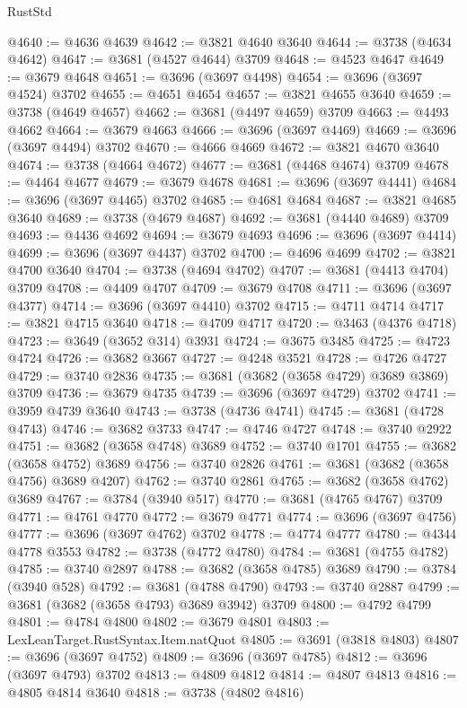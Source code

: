 \begin{lexlean}{RustStd}
\begin{coremodule}
@4640 := @4636 @4639
@4642 := @3821 @4640 @3640
@4644 := @3738 (@4634 @4642)
@4647 := @3681 (@4527 @4644) @3709
@4648 := @4523 @4647
@4649 := @3679 @4648
@4651 := @3696 (@3697 @4498)
@4654 := @3696 (@3697 @4524) @3702
@4655 := @4651 @4654
@4657 := @3821 @4655 @3640
@4659 := @3738 (@4649 @4657)
@4662 := @3681 (@4497 @4659) @3709
@4663 := @4493 @4662
@4664 := @3679 @4663
@4666 := @3696 (@3697 @4469)
@4669 := @3696 (@3697 @4494) @3702
@4670 := @4666 @4669
@4672 := @3821 @4670 @3640
@4674 := @3738 (@4664 @4672)
@4677 := @3681 (@4468 @4674) @3709
@4678 := @4464 @4677
@4679 := @3679 @4678
@4681 := @3696 (@3697 @4441)
@4684 := @3696 (@3697 @4465) @3702
@4685 := @4681 @4684
@4687 := @3821 @4685 @3640
@4689 := @3738 (@4679 @4687)
@4692 := @3681 (@4440 @4689) @3709
@4693 := @4436 @4692
@4694 := @3679 @4693
@4696 := @3696 (@3697 @4414)
@4699 := @3696 (@3697 @4437) @3702
@4700 := @4696 @4699
@4702 := @3821 @4700 @3640
@4704 := @3738 (@4694 @4702)
@4707 := @3681 (@4413 @4704) @3709
@4708 := @4409 @4707
@4709 := @3679 @4708
@4711 := @3696 (@3697 @4377)
@4714 := @3696 (@3697 @4410) @3702
@4715 := @4711 @4714
@4717 := @3821 @4715 @3640
@4718 := @4709 @4717
@4720 := @3463 (@4376 @4718)
@4723 := @3649 (@3652 @314) @3931
@4724 := @3675 @3485
@4725 := @4723 @4724
@4726 := @3682 @3667
@4727 := @4248 @3521
@4728 := @4726 @4727
@4729 := @3740 @2836
@4735 := @3681 (@3682 (@3658 @4729) @3689 @3869) @3709
@4736 := @3679 @4735
@4739 := @3696 (@3697 @4729) @3702
@4741 := @3959 @4739 @3640
@4743 := @3738 (@4736 @4741)
@4745 := @3681 (@4728 @4743)
@4746 := @3682 @3733
@4747 := @4746 @4727
@4748 := @3740 @2922
@4751 := @3682 (@3658 @4748) @3689
@4752 := @3740 @1701
@4755 := @3682 (@3658 @4752) @3689
@4756 := @3740 @2826
@4761 := @3681 (@3682 (@3658 @4756) @3689 @4207)
@4762 := @3740 @2861
@4765 := @3682 (@3658 @4762) @3689
@4767 := @3784 (@3940 @517)
@4770 := @3681 (@4765 @4767) @3709
@4771 := @4761 @4770
@4772 := @3679 @4771
@4774 := @3696 (@3697 @4756)
@4777 := @3696 (@3697 @4762) @3702
@4778 := @4774 @4777
@4780 := @4344 @4778 @3553
@4782 := @3738 (@4772 @4780)
@4784 := @3681 (@4755 @4782)
@4785 := @3740 @2897
@4788 := @3682 (@3658 @4785) @3689
@4790 := @3784 (@3940 @528)
@4792 := @3681 (@4788 @4790)
@4793 := @3740 @2887
@4799 := @3681 (@3682 (@3658 @4793) @3689 @3942) @3709
@4800 := @4792 @4799
@4801 := @4784 @4800
@4802 := @3679 @4801
@4803 := LexLeanTarget.RustSyntax.Item.natQuot
@4805 := @3691 (@3818 @4803)
@4807 := @3696 (@3697 @4752)
@4809 := @3696 (@3697 @4785)
@4812 := @3696 (@3697 @4793) @3702
@4813 := @4809 @4812
@4814 := @4807 @4813
@4816 := @4805 @4814 @3640
@4818 := @3738 (@4802 @4816)

\end{coremodule}
\end{lexlean}
